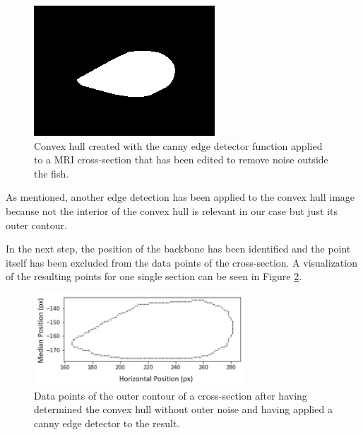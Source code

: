 \begin{figure}
    \centering
    \includegraphics[width = 0.5 \textwidth]{figures/Convexhull68.png}
    \caption{Convex hull created with the canny edge detector function applied to a MRI cross-section that has been edited to remove noise outside the fish. }
    \label{fig:convexhull}
\end{figure}

As mentioned, another edge detection has been applied to the convex hull image because not the interior of the convex hull is relevant in our case but just its outer contour.

In the next step, the position of the backbone has been identified and the point itself has been excluded from the data points of the cross-section. A visualization of the resulting points for one single section can be seen in Figure \ref{fig:contours}. 
\begin{figure}
    \centering
    \includegraphics[width = 0.7\textwidth]{figures/contours_tight.PNG}
    \caption{Data points of the outer contour of a cross-section after having determined the convex hull without outer noise and having applied a canny edge detector to the result. }
    \label{fig:contours}
\end{figure}

